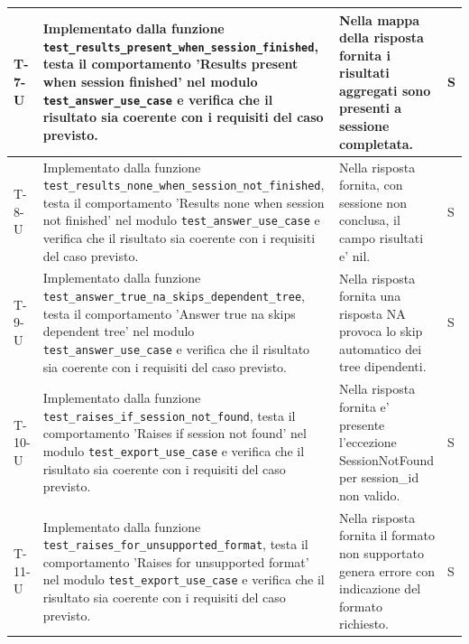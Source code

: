 \documentclass[a4paper,12pt]{article}
\begin{document}
{{\begin{longtable}{|>{\RaggedRight\arraybackslash}p{1.55cm}|>{\RaggedRight\arraybackslash}p{8.0cm}|>{\RaggedRight\arraybackslash}p{4.6cm}|>{\RaggedRight\arraybackslash}p{1.2cm}|}
        \hline
        T-7-U & Implementato dalla funzione \texttt{test\_\allowbreak results\_\allowbreak present\_\allowbreak when\_\allowbreak session\_\allowbreak finished}, testa il comportamento 'Results present when session finished' nel modulo \texttt{test\_\allowbreak answer\_\allowbreak use\_\allowbreak case} e verifica che il risultato sia coerente con i requisiti del caso previsto. & Nella mappa della risposta fornita i risultati aggregati sono presenti a sessione completata. & S \\
        \hline
        T-8-U & Implementato dalla funzione \texttt{test\_\allowbreak results\_\allowbreak none\_\allowbreak when\_\allowbreak session\_\allowbreak not\_\allowbreak finished}, testa il comportamento 'Results none when session not finished' nel modulo \texttt{test\_\allowbreak answer\_\allowbreak use\_\allowbreak case} e verifica che il risultato sia coerente con i requisiti del caso previsto. & Nella risposta fornita, con sessione non conclusa, il campo risultati e' nil. & S \\
        \hline
        T-9-U & Implementato dalla funzione \texttt{test\_\allowbreak answer\_\allowbreak true\_\allowbreak na\_\allowbreak skips\_\allowbreak dependent\_\allowbreak tree}, testa il comportamento 'Answer true na skips dependent tree' nel modulo \texttt{test\_\allowbreak answer\_\allowbreak use\_\allowbreak case} e verifica che il risultato sia coerente con i requisiti del caso previsto. & Nella risposta fornita una risposta NA provoca lo skip automatico dei tree dipendenti. & S \\
        \hline
        T-10-U & Implementato dalla funzione \texttt{test\_\allowbreak raises\_\allowbreak if\_\allowbreak session\_\allowbreak not\_\allowbreak found}, testa il comportamento 'Raises if session not found' nel modulo \texttt{test\_\allowbreak export\_\allowbreak use\_\allowbreak case} e verifica che il risultato sia coerente con i requisiti del caso previsto. & Nella risposta fornita e' presente l'eccezione SessionNotFound per session\_id non valido. & S \\
        \hline
        T-11-U & Implementato dalla funzione \texttt{test\_\allowbreak raises\_\allowbreak for\_\allowbreak unsupported\_\allowbreak format}, testa il comportamento 'Raises for unsupported format' nel modulo \texttt{test\_\allowbreak export\_\allowbreak use\_\allowbreak case} e verifica che il risultato sia coerente con i requisiti del caso previsto. & Nella risposta fornita il formato non supportato genera errore con indicazione del formato richiesto. & S \\

\end{longtable}}}
\end{document}
